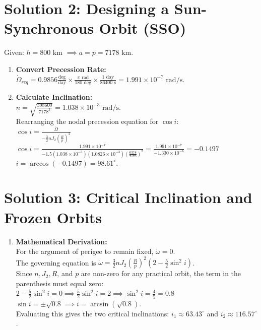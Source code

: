 \documentclass[12pt, letterpaper]{article}
\begin{document}
\section*{Solution 2: Designing a Sun-Synchronous Orbit (SSO)}
Given: $h = 800$ km $\implies a = p = 7178$ km.
\begin{enumerate}
    \item[a)] \textbf{Convert Precession Rate:} \\
    $\dot{\Omega}_{req} = 0.9856 \frac{\text{deg}}{\text{day}} \times \frac{\pi \text{ rad}}{180 \text{ deg}} \times \frac{1 \text{ day}}{86400 \text{ s}} = 1.991 \times 10^{-7} \text{ rad/s}$.
    
    \item[b)] \textbf{Calculate Inclination:} \\
    $n = \sqrt{\frac{398600}{7178^3}} = 1.038 \times 10^{-3} \text{ rad/s}$. \\
    Rearranging the nodal precession equation for $\cos i$: \\
    $\cos i = \frac{\dot{\Omega}}{-\frac{3}{2} n J_2 \left(\frac{R}{p}\right)^2}$ \\
    $\cos i = \frac{1.991 \times 10^{-7}}{-1.5 (1.038 \times 10^{-3}) (1.0826 \times 10^{-3}) \left(\frac{6378}{7178}\right)^2} = \frac{1.991 \times 10^{-7}}{-1.330 \times 10^{-6}} = -0.1497$ \\
    $i = \arccos(-0.1497) = 98.61^\circ$.
\end{enumerate}

\section*{Solution 3: Critical Inclination and Frozen Orbits}
\begin{enumerate}
    \item[a)] \textbf{Mathematical Derivation:} \\
    For the argument of perigee to remain fixed, $\dot{\omega} = 0$. \\
    The governing equation is $\dot{\omega} = \frac{3}{2} n J_2 \left(\frac{R}{p}\right)^2 \left(2 - \frac{5}{2}\sin^2 i\right)$. \\
    Since $n, J_2, R$, and $p$ are non-zero for any practical orbit, the term in the parenthesis must equal zero: \\
    $2 - \frac{5}{2}\sin^2 i = 0 \implies \frac{5}{2}\sin^2 i = 2 \implies \sin^2 i = \frac{4}{5} = 0.8$ \\
    $\sin i = \pm \sqrt{0.8} \implies i = \arcsin(\sqrt{0.8})$. \\
    Evaluating this gives the two critical inclinations: $i_1 \approx 63.43^\circ$ and $i_2 \approx 116.57^\circ$.
\end{enumerate}
\end{document}
